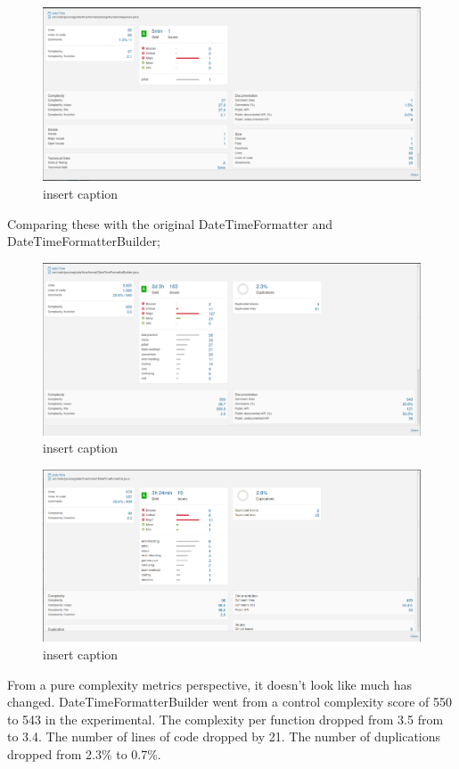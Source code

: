 \begin{figure}[H]
	\centering
	\includegraphics[width=\linewidth]{metric4}
	\caption{insert caption}
\end{figure}

Comparing these with the original DateTimeFormatter and DateTimeFormatterBuilder;  

\begin{figure}[H]
	\centering
	\includegraphics[width=\linewidth]{metric5}
	\caption{insert caption}
\end{figure}
\begin{figure}[H]
	\centering
	\includegraphics[width=\linewidth]{metric6}
	\caption{insert caption}
\end{figure}

From a pure complexity metrics perspective, it doesn’t look like much has changed. DateTimeFormatterBuilder went from a control complexity score of 550 to 543 in the experimental. The complexity per function dropped from 3.5 from to 3.4. The number of lines of code dropped by 21. The number of duplications dropped from 2.3\% to 0.7\%.
 
